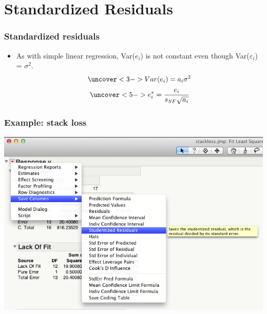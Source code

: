 \documentclass[handout]{beamer}\usepackage[]{graphicx}\usepackage[]{color}
\providecommand{\e}{\varepsilon}
\numberwithin{equation}{section}
\begin{document}
\section{Standardized Residuals}

\begin{frame}
\frametitle{Standardized residuals}
\begin{itemize}
\item As with simple linear regression, Var($e_i$) is not constant even though Var($\e_i$) = $\sigma^2$. 
\begin{align*}
\uncover<3->{Var(e_i) = a_i \sigma^2}
\end{align*}
\begin{align*}
\uncover<5->{e_i^* = \frac{e_i}{s_{SF} \sqrt{a_i}}}
\end{align*}
\end{itemize}
\end{frame}

\begin{frame}
\frametitle{Example: stack loss}
 \includegraphics{../../fig/stackstd1.png}
\end{frame}
\end{document}
